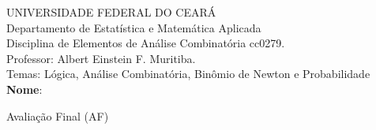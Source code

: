 \documentclass[a4paper,12pt]{article}  %
\begin{document}
\thispagestyle{empty}

UNIVERSIDADE FEDERAL DO CEARÁ\\
Departamento de Estatística e Matemática Aplicada\\
Disciplina de Elementos de Análise Combinatória cc0279.\\
Professor: Albert Einstein F. Muritiba.\\
Temas: Lógica, Análise Combinatória, Binômio de Newton e Probabilidade\\[0.2cm]
\textbf{Nome}: \makebox[380pt]{\hrulefill} \vspace{2pt}
\begin{center}
	Avaliação Final (AF)
\end{center}
\end{document}
